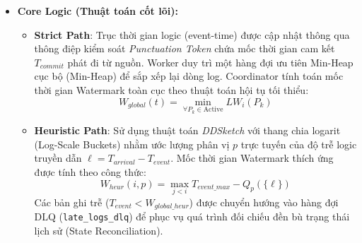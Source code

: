 \documentclass[12pt,a4paper]{article}
\begin{document}
\begin{itemize}[leftmargin=*]
    \item \textbf{Core Logic (Thuật toán cốt lõi):}
    \begin{itemize}[label={-}]
        \item \textbf{Strict Path}: Trục thời gian logic (event-time) được cập nhật thông qua thông điệp kiểm soát \textit{Punctuation Token} chứa mốc thời gian cam kết $T_{commit}$ phát đi từ nguồn. Worker duy trì một hàng đợi ưu tiên Min-Heap cục bộ (Min-Heap) để sắp xếp lại dòng log. Coordinator tính toán mốc thời gian Watermark toàn cục theo thuật toán hội tụ tối thiểu:
        {\large
        \begin{equation}
            \boxed{\displaystyle W_{global}(t) = \min_{\forall P_k \in \text{Active}} LW_i(P_k)}
        \end{equation}
        }
        \item \textbf{Heuristic Path}: Sử dụng thuật toán \textit{DDSketch} với thang chia logarit (Log-Scale Buckets) nhằm ước lượng phân vị $p$ trực tuyến của độ trễ logic truyền dẫn $\ell = T_{arrival} - T_{event}$. Mốc thời gian Watermark thích ứng được tính theo công thức:
        {\large
        \begin{equation}
            \boxed{\displaystyle W_{heur}(i, p) = \max_{j < i} T_{event\_max} - Q_p(\{\ell\})}
        \end{equation}
        }
        Các bản ghi trễ ($T_{event} < W_{global\_heur}$) được chuyển hướng vào hàng đợi DLQ (\texttt{late\_logs\_dlq}) để phục vụ quá trình đối chiếu đền bù trạng thái lịch sử (State Reconciliation).
    \end{itemize}
\end{itemize}

\vspace{0.5cm}

\end{document}
